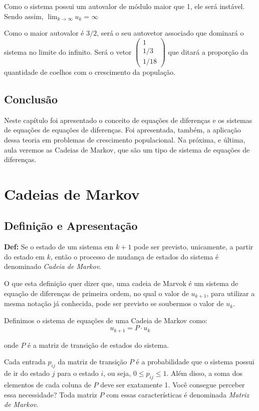 \documentclass[12pt]{article}
\begin{document}
Como o sistema possui um autovalor de módulo maior que 1, ele será instável. Sendo assim, $\lim_{k\to\infty}u_k=\infty$

Como o maior autovalor é $3/2$, será o seu autovetor associado que dominará o sistema no limite do infinito. Será o vetor $\begin{pmatrix}
	1 \\
	1/3 \\
	1/18
\end{pmatrix}$ que ditará a proporção da quantidade de coelhos com o crescimento da população.

\subsection{Conclusão}
Neste capítulo foi apresentado o conceito de equações de diferenças e os sistemas de equações de equações de diferenças. Foi apresentada, também, a aplicação dessa teoria em problemas de crescimento populacional. Na próxima, e última, aula veremos as Cadeias de Markov, que são um tipo de sistema de equações de diferenças.


\section{Cadeias de Markov}

\subsection{Definição e Apresentação}

\textbf{Def: }Se o estado de um sistema em $k+1$ pode ser previsto, unicamente, a partir do estado em $k$, então o processo de mudança de estados do sistema é denominado \textit{Cadeia de Markov}.

O que esta definição quer dizer que, uma cadeia de Marvok é um sistema de equação de diferenças de primeira ordem, no qual o valor de $u_{k+1}$, para utilizar a mesma notação já conhecida, pode ser previsto se soubermos o valor de $u_k$.

Definimos o sistema de equações de uma Cadeia de Markov como:
\begin{equation*}
	u_{k+1}=P\cdot u_k
\end{equation*}

onde $P$ é a matriz de transição de estados do sistema.

Cada entrada $p_{ij}$ da matriz de transição $P$ é a probabilidade que o sistema possui de ir do estado $j$ para o estado $i$, ou seja, $0\leq p_{ij}\leq1$. Além disso, a soma dos elementos de cada coluna de $P$ deve ser exatamente 1. Você consegue perceber essa necessidade? Toda matriz $P$ com essas características é denominada \textit{Matriz de Markov}.
\end{document}
